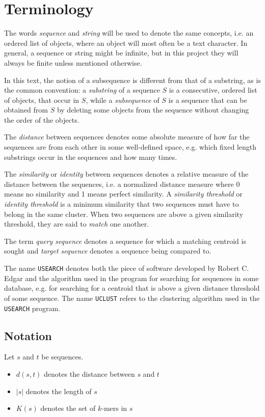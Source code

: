 \section{Terminology}

The words \emph{sequence} and \emph{string} will be used to denote the same
concepts, i.e. an ordered list of objects, where an object will most often be a
text character. In general, a sequence or string might be infinite, but in this
project they will always be finite unless mentioned otherwise.

In this text, the notion of a subsequence is different from that of a
substring, as is the common convention: a \emph{substring} of a sequence $S$ is
a consecutive, ordered list of objects, that occur in $S$, while a
\emph{subsequence} of $S$ is a sequence that can be obtained from $S$ by
deleting some objects from the sequence without changing the order of the
objects.

The \emph{distance} between sequences denotes some absolute measure of how far
the sequences are from each other in some well-defined space, e.g. which fixed
length substrings occur in the sequences and how many times.

The \emph{similarity} or \emph{identity} between sequences denotes a relative
measure of the distance between the sequences, i.e. a normalized distance
measure where \num{0} means no similarity and \num{1} means perfect similarity. A
\emph{similarity threshold} or \emph{identity threshold} is a minimum
similarity that two sequences must have to belong in the same cluster.  When
two sequences are above a given similarity threshold, they are said to
\emph{match} one another.

The term \emph{query sequence} denotes a sequence for which a matching centroid
is sought and \emph{target sequence} denotes a sequence being compared to.

The name \texttt{USEARCH} denotes both the piece of software developed by
Robert C. Edgar and the algorithm used in the program for searching for
sequences in some database, e.g. for searching for a centroid that is above a
given distance threshold of some sequence. The name \texttt{UCLUST} refers to
the clustering algorithm used in the \texttt{USEARCH} program.


\subsection{Notation}

Let $s$ and $t$ be sequences.
\begin{itemize}
  \item $d(s,t)$ denotes the distance between $s$ and $t$
  \item $|s|$ denotes the length of $s$
  \item $K(s)$ denotes the set of $k$-mers in $s$
\end{itemize}
